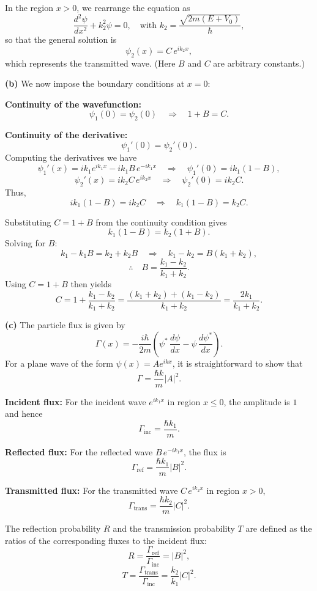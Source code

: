 \documentclass{article}
\begin{document}
In the region \(x>0\), we rearrange the equation as
\[
\frac{d^2\psi}{dx^2} + k_2^2 \psi = 0, \quad \text{with } k_2 = \frac{\sqrt{2m(E+V_0)}}{\hbar},
\]
so that the general solution is
\[
\psi_2(x) = C\,e^{ik_2x},
\]
which represents the transmitted wave. (Here \(B\) and \(C\) are arbitrary constants.)

\vspace{0.5em}
\textbf{(b)} \quad We now impose the boundary conditions at \(x=0\):

\textbf{Continuity of the wavefunction:}
\[
\psi_1(0)=\psi_2(0) \quad \Longrightarrow \quad 1+B = C.
\]

\textbf{Continuity of the derivative:}
\[
\psi_1'(0)=\psi_2'(0).
\]
Computing the derivatives we have
\[
\psi_1'(x)=ik_1e^{ik_1x}-ik_1B\,e^{-ik_1x} \quad \Rightarrow \quad \psi_1'(0)=ik_1(1-B),
\]
\[
\psi_2'(x)=ik_2C\,e^{ik_2x} \quad \Rightarrow \quad \psi_2'(0)=ik_2C.
\]
Thus,
\[
ik_1(1-B)=ik_2C \quad \Longrightarrow \quad k_1(1-B)=k_2C.
\]

Substituting \(C=1+B\) from the continuity condition gives
\[
k_1(1-B)=k_2(1+B).
\]
Solving for \(B\):
\[
k_1 - k_1B = k_2 + k_2B \quad \Longrightarrow \quad k_1 - k_2 = B(k_1+k_2),
\]
\[
\therefore \quad B = \frac{k_1-k_2}{k_1+k_2}.
\]
Using \(C=1+B\) then yields
\[
C = 1+\frac{k_1-k_2}{k_1+k_2} = \frac{(k_1+k_2)+(k_1-k_2)}{k_1+k_2} = \frac{2k_1}{k_1+k_2}.
\]

\vspace{0.5em}
\textbf{(c)} \quad The particle flux is given by
\[
\Gamma(x) = -\frac{i\hbar}{2m}\left(\psi^*\,\frac{d\psi}{dx} - \psi\,\frac{d\psi^*}{dx}\right).
\]
For a plane wave of the form \(\psi(x)=Ae^{ikx}\), it is straightforward to show that
\[
\Gamma = \frac{\hbar k}{m}|A|^2.
\]

\textbf{Incident flux:} For the incident wave \(e^{ik_1x}\) in region \(x\le0\), the amplitude is \(1\) and hence
\[
\Gamma_{\text{inc}} = \frac{\hbar k_1}{m}.
\]

\textbf{Reflected flux:} For the reflected wave \(B\,e^{-ik_1x}\), the flux is
\[
\Gamma_{\text{ref}} = \frac{\hbar k_1}{m}|B|^2.
\]

\textbf{Transmitted flux:} For the transmitted wave \(C\,e^{ik_2x}\) in region \(x>0\),
\[
\Gamma_{\text{trans}} = \frac{\hbar k_2}{m}|C|^2.
\]

The reflection probability \(R\) and the transmission probability \(T\) are defined as the ratios of the corresponding fluxes to the incident flux:
\[
R = \frac{\Gamma_{\text{ref}}}{\Gamma_{\text{inc}}} = |B|^2,
\]
\[
T = \frac{\Gamma_{\text{trans}}}{\Gamma_{\text{inc}}} = \frac{k_2}{k_1}|C|^2.
\]
\end{document}

